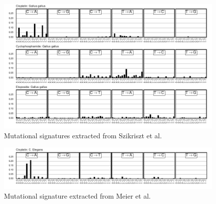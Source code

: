 \FloatBarrier

\begin{figure}
\centering
\includegraphics[scale=1.0]{figures/extracted_signatures_chicken.pdf}
\caption{Mutational signatures extracted from Szikriszt et al.~\cite{Szikriszt_2016}}
\label{fig:supp_extracted_signatures_chicken}
\end{figure}

\begin{figure}
\centering
\includegraphics[scale=1.0]{figures/extracted_signatures_worm.pdf}
\caption{Mutational signature extracted from Meier et al.~\cite{Meier_2014}}
\label{fig:supp_extracted_signatures_worm}
\end{figure}

